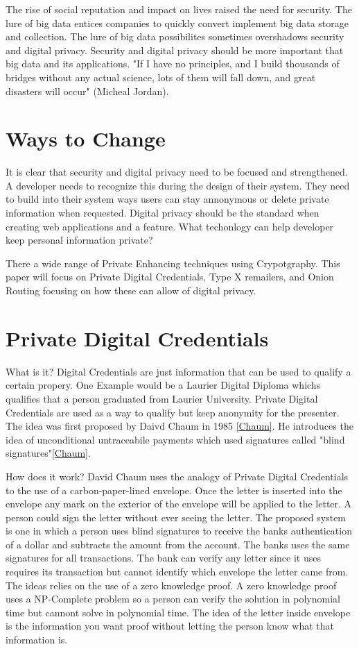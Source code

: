 \documentclass[12pt]{article}
\begin{document}
The rise of social reputation and impact on lives raised the need for security. The lure of big data entices companies to quickly convert implement big data storage and collection. The lure of big data possibilites sometimes overshadows security and digital privacy. Security and digital privacy should be more important that big data and its applications. "If I have no principles, and I build thousands of bridges without any actual science, lots of them will fall down, and great disasters will occur" (Micheal Jordan)\cite{Gomes}.

\section{Ways to  Change}\label{sec:developers}
It is clear that security and digital privacy need to be focused and strengthened. A developer needs to recognize this during the design of their system. They need to build into their system ways users can stay annonymous or delete private information when requested. Digital privacy should be the standard when creating web applications and a feature. What techonlogy can help developer keep personal information private?

There a wide range of Private Enhancing techniques using Crypotgraphy. This paper will focus on Private Digital Credentials, Type X remailers, and Onion Routing focusing on how these can allow of digital privacy.

\section{Private Digital Credentials}\label{sec:PDC}
What is it?
Digital Credentials are just information that can be used to qualify a certain propery. One Example would be a Laurier Digital Diploma whichs qualifies that a person graduated from Laurier University.  Private Digital Credentials are used as a way to qualify but keep anonymity for the presenter. The idea was first proposed by Daivd Chaum in 1985 \ref{Chaum}. He introduces the idea of unconditional untraceabile payments which used signatures called "blind signatures"\ref{Chaum}. 

How does it work?
David Chaum uses the analogy of Private Digital Credentials to the use of a carbon-paper-lined envelope. Once the letter is inserted into the envelope any mark on the exterior of the envelope will be applied to the letter. A person could sign the letter without ever seeing the letter. The proposed system is one in which a person uses blind signatures to receive the banks authentication of a dollar and subtracts the amount from the account. The banks uses the same signatures for all transactions. The bank can verify any letter since it uses requires its transaction but cannot identify which envelope the letter came from. The ideas relies on the use of a zero knowledge proof. A zero knowledge proof uses a NP-Complete problem so a person can verify the solution in polynomial time but cannont solve in polynomial time. The idea of the letter inside envelope is the information you want proof without letting the person know what that information is.
\end{document}

